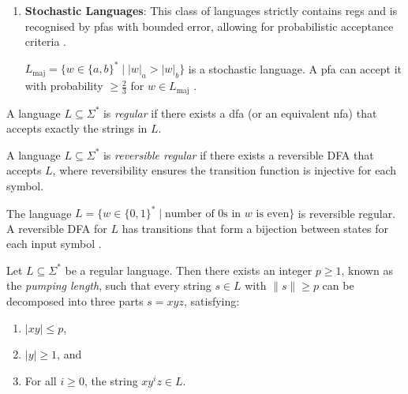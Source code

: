 \begin{enumerate}
    \item \textbf{Stochastic Languages}: 
    This class of languages strictly contains \glspl{reg} and is recognised by \glspl{pfa} with bounded error, allowing for probabilistic acceptance criteria \cite{rabin1963probabilistic, droste2009handbook}.  
    \begin{example}
    $L_{\text{maj}} = \{w \in \{a,b\}^* \mid |w|_a > |w|_b\}$ is a stochastic language. A \gls{pfa} can accept it with probability $\geq \frac{2}{3}$ for $w \in L_{\text{maj}}$ \cite{rabin1963probabilistic}.
    \end{example}
\end{enumerate}

\begin{definition}
A language $L \subseteq \Sigma^\ast$ is \textit{regular} if there exists a \gls{dfa} (or an equivalent \gls{nfa}) that accepts exactly the strings in $L$.
\end{definition}

\begin{definition}
    A language \( L \subseteq \Sigma^* \) is \textit{reversible regular} if there exists a reversible DFA that accepts \( L \), where reversibility ensures the transition function is injective for each symbol.
\end{definition}
    
\begin{example}
    The language \( L = \{w \in \{0,1\}^* \mid \text{number of 0s in } w \text{ is even}\} \) is reversible regular. A reversible DFA for \( L \) has transitions that form a bijection between states for each input symbol \cite{pin1997syntactic}.
\end{example}

\begin{theorem}
\label{thm:pumping-lemma}
Let $L \subseteq \Sigma^\ast$ be a regular language. Then there exists an integer $p \geq 1$, known as the \textit{pumping length}, such that every string $s \in L$ with $\|s\| \geq p$ can be decomposed into three parts $s = xyz$, satisfying:
\begin{enumerate}
    \item $|xy| \leq p$,
    \item $|y| \geq 1$, and
    \item For all $i \geq 0$, the string $xy^iz \in L$.
\end{enumerate}
\end{theorem}

